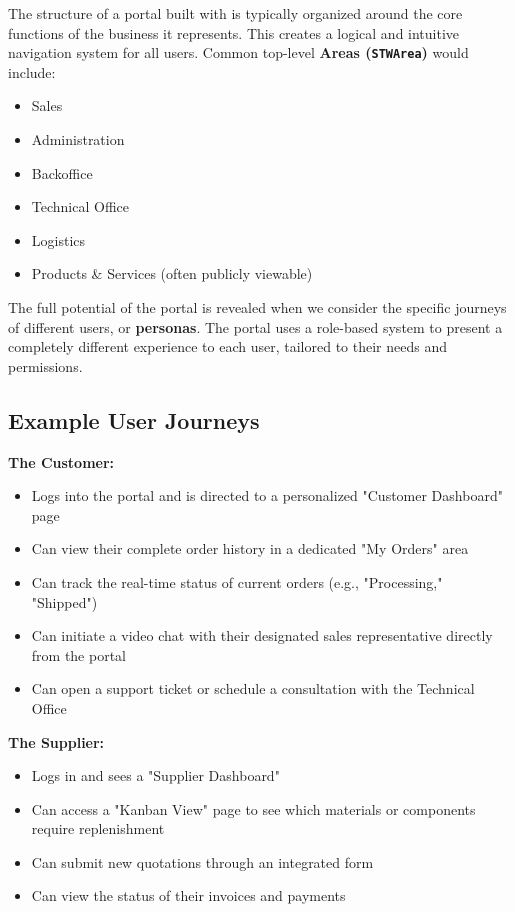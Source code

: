 The structure of a portal built with \wbdl{} is typically organized around the core functions of the business it represents. This creates a logical and intuitive navigation system for all users. Common top-level \textbf{Areas (\texttt{STWArea})} would include:

\begin{itemize}
	\item Sales
	\item Administration
	\item Backoffice
	\item Technical Office
	\item Logistics
	\item Products \& Services (often publicly viewable)
\end{itemize}

The full potential of the portal is revealed when we consider the specific journeys of different users, or \textbf{personas}. The portal uses a role-based system to present a completely different experience to each user, tailored to their needs and permissions.

\subsection{Example User Journeys}

\textbf{The Customer:}
\begin{itemize}
	\item Logs into the portal and is directed to a personalized "Customer Dashboard" page
	\item Can view their complete order history in a dedicated "My Orders" area
	\item Can track the real-time status of current orders (e.g., "Processing," "Shipped")
	\item Can initiate a video chat with their designated sales representative directly from the portal
	\item Can open a support ticket or schedule a consultation with the Technical Office
\end{itemize}

\textbf{The Supplier:}
\begin{itemize}
	\item Logs in and sees a "Supplier Dashboard"
	\item Can access a "Kanban View" page to see which materials or components require replenishment
	\item Can submit new quotations through an integrated form
	\item Can view the status of their invoices and payments
\end{itemize}

